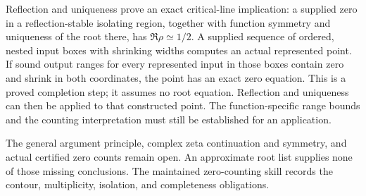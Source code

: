 Reflection and uniqueness prove an exact critical-line implication: a supplied
zero in a reflection-stable isolating region, together with function symmetry
and uniqueness of the root there, has \(\Re\rho\simeq1/2\).
A supplied sequence of ordered, nested input boxes with shrinking widths
computes an actual represented point. If sound output ranges for every
represented input in those boxes contain zero and shrink in both coordinates,
the point has an exact zero equation. This is a proved completion step;
it assumes no root equation. Reflection and uniqueness can then be applied
to that constructed point. The function-specific range bounds and the
counting interpretation must still be established for an application.

The general argument principle, complex zeta continuation and symmetry, and
actual certified zero counts remain open. An approximate root list supplies
none of those missing conclusions. The maintained zero-counting skill records
the contour, multiplicity, isolation, and completeness obligations.

